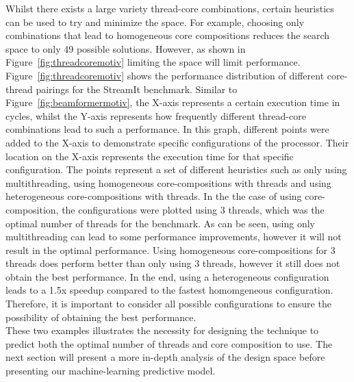 Whilst there exists a large variety thread-core combinations, certain heuristics can be used to try and minimize the space.
For example, choosing only combinations that lead to homogeneous core compositions reduces the search space to only 49 possible solutions.
However, as shown in Figure~\ref{fig:threadcoremotiv} limiting the space will limit performance.
Figure~\ref{fig:threadcoremotiv} shows the performance distribution of different core-thread pairings for the  StreamIt benchmark.
Similar to Figure~\ref{fig:beamformermotiv}, the X-axis represents a certain execution time in cycles, whilst the Y-axis represents how frequently different thread-core combinations lead to such a performance.
In this graph, different points were added to the X-axis to demonstrate specific configurations of the processor.
Their location on the X-axis represents the execution time for that specific configuration.
The points represent a set of different heuristics such as only using multithreading, using homogeneous core-compositions with threads and using heterogeneous core-compositions with threads.
In the the case of using core-composition, the configurations were plotted using 3 threads, which was the optimal number of threads for the benchmark.
As can be seen, using only multithreading can lead to some performance improvements, however it will not result in the optimal performance.
Using homogeneous core-compositions for 3 threads does perform better than only using 3 threads, however it still does not obtain the best performance.
In the end, using a heterogeneous configuration leads to a 1.5x speedup compared to the fastest homomgeneous configuration.
Therefore, it is important to consider all possible configurations to ensure the possibility of obtaining the best performance.\\

These two examples illustrates the necessity for designing the technique to predict both the optimal number of threads and core composition to use.
The next section will present a more in-depth analysis of the design space before presenting our machine-learning predictive model.

